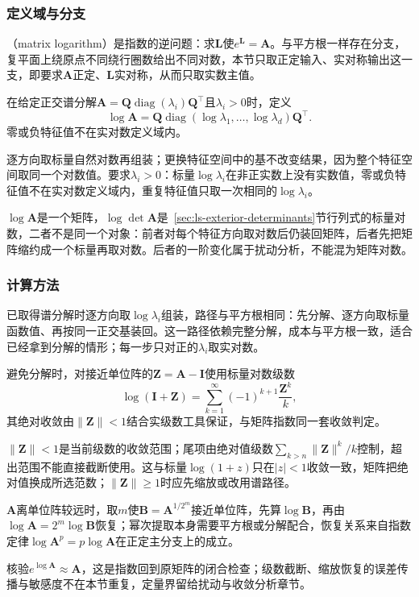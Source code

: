 \subsubsection{定义域与分支}

（matrix logarithm）是指数的逆问题：求$\bm L$使$e^{\bm L}=\bm A$。与平方根一样存在分支，复平面上绕原点不同绕行圈数给出不同对数，本节只取正定输入、实对称输出这一支，即要求$\bm A$正定、$\bm L$实对称，从而只取实数主值。

在给定正交谱分解$\bm A=\bm Q\operatorname{diag}(\lambda_i)\bm Q^\top$且$\lambda_i>0$时，定义
\[
 \log\bm A=\bm Q\operatorname{diag}(\log\lambda_1,\ldots,\log\lambda_d)\bm Q^\top.
\]
零或负特征值不在实对数定义域内。

逐方向取标量自然对数再组装；更换特征空间中的基不改变结果，因为整个特征空间取同一个对数值。要求$\lambda_i>0$：标量$\log\lambda_i$在非正实数上没有实数值，零或负特征值不在实对数定义域内，重复特征值只取一次相同的$\log\lambda_i$。

$\log\bm A$是一个矩阵，$\log\det\bm A$是~\ref{sec:ls-exterior-determinants}节行列式的标量对数，二者不是同一个对象：前者对每个特征方向取对数后仍装回矩阵，后者先把矩阵缩约成一个标量再取对数。后者的一阶变化属于扰动分析，不能混为矩阵对数。

\subsubsection{计算方法}

已取得谱分解时逐方向取$\log\lambda_i$组装，路径与平方根相同：先分解、逐方向取标量函数值、再按同一正交基装回。这一路径依赖完整分解，成本与平方根一致，适合已经拿到分解的情形；每一步只对正的$\lambda_i$取实对数。

避免分解时，对接近单位阵的$\bm Z=\bm A-\bm I$使用标量对数级数
\[
 \log(\bm I+\bm Z)=\sum_{k=1}^{\infty}(-1)^{k+1}\frac{\bm Z^k}{k},
\]
其绝对收敛由$\lVert\bm Z\rVert<1$结合实级数工具保证，与矩阵指数同一套收敛判定。

$\lVert\bm Z\rVert<1$是当前级数的收敛范围；尾项由绝对值级数$\sum_{k>n}\lVert\bm Z\rVert^k/k$控制，超出范围不能直接截断使用。这与标量$\log(1+z)$只在$|z|<1$收敛一致，矩阵把绝对值换成所选范数；$\lVert\bm Z\rVert\geq1$时应先缩放或改用谱路径。

$\bm A$离单位阵较远时，取$m$使$\bm B=\bm A^{1/2^m}$接近单位阵，先算$\log\bm B$，再由$\log\bm A=2^m\log\bm B$恢复；幂次提取本身需要平方根或分解配合，恢复关系来自指数定律$\log\bm A^p=p\log\bm A$在正定主分支上的成立。

核验$e^{\log\bm A}\approx\bm A$，这是指数回到原矩阵的闭合检查；级数截断、缩放恢复的误差传播与敏感度不在本节重复，定量界留给扰动与收敛分析章节。

